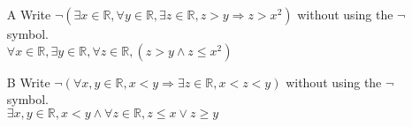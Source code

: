 \documentclass[12pt]{article}
\begin{document}
\begin{enumerate}
	\item [A] Write $\neg(\exists x \in \mathbb{R}, \forall y \in \mathbb{R}, \exists z \in \mathbb{R}, z > y \Rightarrow z > x^2)$ without using the $\neg$ symbol.\\
	    $\forall x \in \mathbb{R}, \exists y \in \mathbb{R}, \forall z \in \mathbb{R}, (z > y \land z \le x^2)$
	\item [B] Write $\neg(\forall x,y \in \mathbb{R}, x < y \Rightarrow \exists z \in \mathbb{R}, x < z < y)$ without using the $\neg$ symbol.\\
	    $\exists x,y \in \mathbb{R}, x < y \land \forall z \in \mathbb{R}, z \le x \lor z \ge y$
\end{enumerate}
\end{document}
